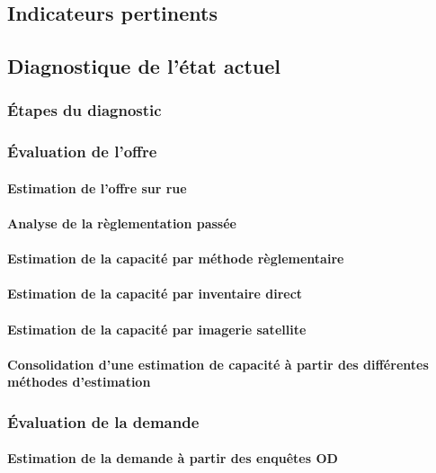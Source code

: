     \subsection{Indicateurs pertinents}

    \subsection{Diagnostique de l'état actuel}
        \subsubsection{Étapes du diagnostic}
        \subsubsection{Évaluation de l'offre}
    \paragraph{Estimation de l'offre sur rue}
    \paragraph{Analyse de la règlementation passée}
    \paragraph{Estimation de la capacité par méthode règlementaire}
    \paragraph{Estimation de la capacité par inventaire direct}
    \paragraph{Estimation de la capacité par imagerie satellite}
    \paragraph{Consolidation d'une estimation de capacité à partir des différentes méthodes d'estimation}
        \subsubsection{Évaluation de la demande}
    \paragraph{Estimation de la demande à partir des enquêtes OD}
